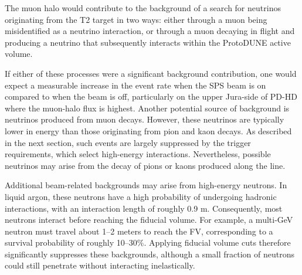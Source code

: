 The muon halo would contribute to the background of a search for neutrinos originating from the T2 target in two ways: either through a muon being misidentified as a neutrino interaction, or through a muon decaying in flight and producing a neutrino that subsequently interacts within the ProtoDUNE active volume.

If either of these processes were a significant background contribution, one would expect a measurable increase in the event rate when the SPS beam is on compared to when the beam is off, particularly on the upper Jura-side of PD-HD where the muon-halo flux is highest. Another potential source of background is neutrinos produced from muon decays. However, these neutrinos are typically lower in energy than those originating from pion and kaon decays. As described in the next section, such events are largely suppressed by the trigger requirements, which select high-energy interactions. Nevertheless, possible neutrinos may arise from the decay of pions or kaons produced along the line.

Additional beam-related backgrounds may arise from high-energy neutrons. In liquid argon, these neutrons have a high probability of undergoing hadronic interactions, with an interaction length of roughly 0.9 m. Consequently, most neutrons interact before reaching the fiducial volume. For example, a multi-GeV neutron must travel about 1–2 meters to reach the FV, corresponding to a survival probability of roughly 10–30$\%$. Applying fiducial volume cuts therefore significantly suppresses these backgrounds, although a small fraction of neutrons could still penetrate without interacting inelastically.

